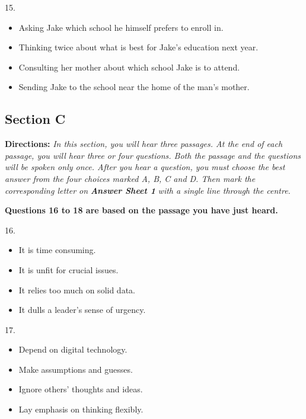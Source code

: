 \documentclass[UTF8,11pt]{ctexart}
\begin{document}
15.


\begin{itemize}[leftmargin=2em,itemsep=.2em,topsep=.4em]\item[A.] Asking Jake which school he himself prefers to enroll in.
\item[B.] Thinking twice about what is best for Jake’s education next year.
\item[C.] Consulting her mother about which school Jake is to attend.
\item[D.] Sending Jake to the school near the home of the man’s mother.
\end{itemize}

\subsection*{\textbf{Section C}}


\textbf{Directions:}\textit{ In this section, you will hear three passages. At the end of each passage, you will hear three or four} \textit{questions. Both the passage and the questions will be spoken only once. After you hear a question, you must} \textit{choose the best answer from the four choices marked A, B, C and D. Then mark the corresponding letter on} \textbf{\textit{Answer Sheet 1}}\textit{ with a single line through the centre.}


\textbf{Questions 16 to 18 are based on the passage you have just heard.}


16.


\begin{itemize}[leftmargin=2em,itemsep=.2em,topsep=.4em]\item[A.] It is time consuming.
\item[B.] It is unfit for crucial issues.
\item[C.] It relies too much on solid data.
\item[D.] It dulls a leader’s sense of urgency.
\end{itemize}

17.


\begin{itemize}[leftmargin=2em,itemsep=.2em,topsep=.4em]\item[A.] Depend on digital technology.
\item[B.] Make assumptions and guesses.
\item[C.] Ignore others’ thoughts and ideas.
\item[D.] Lay emphasis on thinking flexibly.
\end{itemize}
\end{document}
